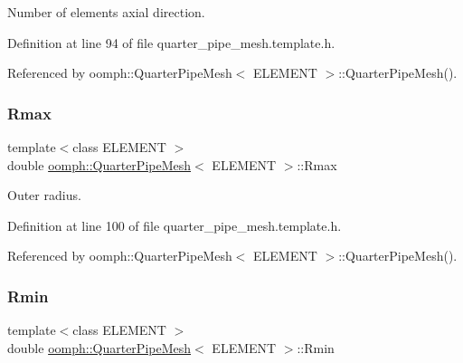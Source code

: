 Number of elements axial direction. 



Definition at line 94 of file quarter\+\_\+pipe\+\_\+mesh.\+template.\+h.



Referenced by oomph\+::\+Quarter\+Pipe\+Mesh$<$ E\+L\+E\+M\+E\+N\+T $>$\+::\+Quarter\+Pipe\+Mesh().

\mbox{\label{classoomph_1_1QuarterPipeMesh_ab080d887f508016140bac78d82be37d4}} 
\subsubsection{\texorpdfstring{Rmax}{Rmax}}
{\footnotesize\ttfamily template$<$class E\+L\+E\+M\+E\+NT $>$ \\
double \hyperlink{classoomph_1_1QuarterPipeMesh}{oomph\+::\+Quarter\+Pipe\+Mesh}$<$ E\+L\+E\+M\+E\+NT $>$\+::Rmax\hspace{0.3cm}{\ttfamily [protected]}}



Outer radius. 



Definition at line 100 of file quarter\+\_\+pipe\+\_\+mesh.\+template.\+h.



Referenced by oomph\+::\+Quarter\+Pipe\+Mesh$<$ E\+L\+E\+M\+E\+N\+T $>$\+::\+Quarter\+Pipe\+Mesh().

\mbox{\label{classoomph_1_1QuarterPipeMesh_aa75ba32bf5f825254f1e92a00109af3e}} 
\subsubsection{\texorpdfstring{Rmin}{Rmin}}
{\footnotesize\ttfamily template$<$class E\+L\+E\+M\+E\+NT $>$ \\
double \hyperlink{classoomph_1_1QuarterPipeMesh}{oomph\+::\+Quarter\+Pipe\+Mesh}$<$ E\+L\+E\+M\+E\+NT $>$\+::Rmin\hspace{0.3cm}{\ttfamily [protected]}}



